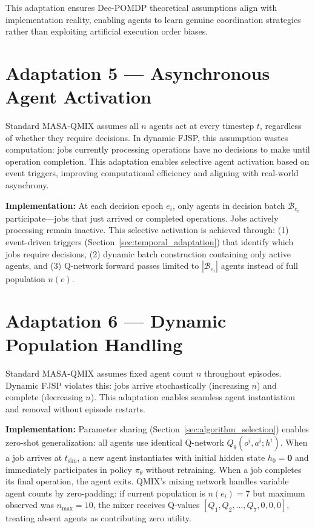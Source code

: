 This adaptation ensures Dec-POMDP theoretical assumptions align with implementation reality, enabling agents to learn genuine coordination strategies rather than exploiting artificial execution order biases.


\section{Adaptation 5 — Asynchronous Agent Activation}
\label{sec:async_adaptation}

Standard MASA-QMIX assumes all \( n \) agents act at every timestep \( t \), regardless of whether they require decisions. In dynamic FJSP, this assumption wastes computation: jobs currently processing operations have no decisions to make until operation completion. This adaptation enables selective agent activation based on event triggers, improving computational efficiency and aligning with real-world asynchrony.

\textbf{Implementation:} At each decision epoch \( e_i \), only agents in decision batch \( \mathcal{B}_{e_i} \) participate—jobs that just arrived or completed operations. Jobs actively processing remain inactive. This selective activation is achieved through: (1) event-driven triggers (Section~\ref{sec:temporal_adaptation}) that identify which jobs require decisions, (2) dynamic batch construction containing only active agents, and (3) Q-network forward passes limited to \( |\mathcal{B}_{e_i}| \) agents instead of full population \( n(e) \).


\section{Adaptation 6 — Dynamic Population Handling}
\label{sec:dynamic_population}

Standard MASA-QMIX assumes fixed agent count \( n \) throughout episodes. Dynamic FJSP violates this: jobs arrive stochastically (increasing \( n \)) and complete (decreasing \( n \)). This adaptation enables seamless agent instantiation and removal without episode restarts.

\textbf{Implementation:} Parameter sharing (Section~\ref{sec:algorithm_selection}) enables zero-shot generalization: all agents use identical Q-network \( Q_{\theta}(o^i, a^i; h^i) \). When a job arrives at \( t_{\text{sim}} \), a new agent instantiates with initial hidden state \( h_0 = \mathbf{0} \) and immediately participates in policy \( \pi_{\theta} \) without retraining. When a job completes its final operation, the agent exits. QMIX's mixing network handles variable agent counts by zero-padding: if current population is \( n(e_i) = 7 \) but maximum observed was \( n_{\max} = 10 \), the mixer receives Q-values \( [Q_1, Q_2, \ldots, Q_7, 0, 0, 0] \), treating absent agents as contributing zero utility.



